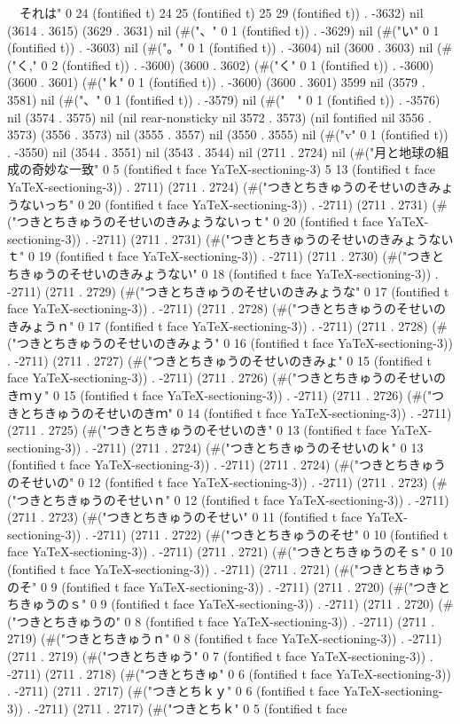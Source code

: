 　それは" 0 24 (fontified t) 24 25 (fontified t) 25 29 (fontified t)) . -3632) nil (3614 . 3615) (3629 . 3631) nil (#("、" 0 1 (fontified t)) . -3629) nil (#("い" 0 1 (fontified t)) . -3603) nil (#("。" 0 1 (fontified t)) . -3604) nil (3600 . 3603) nil (#("く," 0 2 (fontified t)) . -3600) (3600 . 3602) (#("く" 0 1 (fontified t)) . -3600) (3600 . 3601) (#("ｋ" 0 1 (fontified t)) . -3600) (3600 . 3601) 3599 nil (3579 . 3581) nil (#("、" 0 1 (fontified t)) . -3579) nil (#("　" 0 1 (fontified t)) . -3576) nil (3574 . 3575) nil (nil rear-nonsticky nil 3572 . 3573) (nil fontified nil 3556 . 3573) (3556 . 3573) nil (3555 . 3557) nil (3550 . 3555) nil (#("v" 0 1 (fontified t)) . -3550) nil (3544 . 3551) nil (3543 . 3544) nil (2711 . 2724) nil (#("月と地球の組成の奇妙な一致" 0 5 (fontified t face YaTeX-sectioning-3) 5 13 (fontified t face YaTeX-sectioning-3)) . 2711) (2711 . 2724) (#("つきとちきゅうのそせいのきみょうないっち" 0 20 (fontified t face YaTeX-sectioning-3)) . -2711) (2711 . 2731) (#("つきとちきゅうのそせいのきみょうないっｔ" 0 20 (fontified t face YaTeX-sectioning-3)) . -2711) (2711 . 2731) (#("つきとちきゅうのそせいのきみょうないｔ" 0 19 (fontified t face YaTeX-sectioning-3)) . -2711) (2711 . 2730) (#("つきとちきゅうのそせいのきみょうない" 0 18 (fontified t face YaTeX-sectioning-3)) . -2711) (2711 . 2729) (#("つきとちきゅうのそせいのきみょうな" 0 17 (fontified t face YaTeX-sectioning-3)) . -2711) (2711 . 2728) (#("つきとちきゅうのそせいのきみょうｎ" 0 17 (fontified t face YaTeX-sectioning-3)) . -2711) (2711 . 2728) (#("つきとちきゅうのそせいのきみょう" 0 16 (fontified t face YaTeX-sectioning-3)) . -2711) (2711 . 2727) (#("つきとちきゅうのそせいのきみょ" 0 15 (fontified t face YaTeX-sectioning-3)) . -2711) (2711 . 2726) (#("つきとちきゅうのそせいのきｍｙ" 0 15 (fontified t face YaTeX-sectioning-3)) . -2711) (2711 . 2726) (#("つきとちきゅうのそせいのきｍ" 0 14 (fontified t face YaTeX-sectioning-3)) . -2711) (2711 . 2725) (#("つきとちきゅうのそせいのき" 0 13 (fontified t face YaTeX-sectioning-3)) . -2711) (2711 . 2724) (#("つきとちきゅうのそせいのｋ" 0 13 (fontified t face YaTeX-sectioning-3)) . -2711) (2711 . 2724) (#("つきとちきゅうのそせいの" 0 12 (fontified t face YaTeX-sectioning-3)) . -2711) (2711 . 2723) (#("つきとちきゅうのそせいｎ" 0 12 (fontified t face YaTeX-sectioning-3)) . -2711) (2711 . 2723) (#("つきとちきゅうのそせい" 0 11 (fontified t face YaTeX-sectioning-3)) . -2711) (2711 . 2722) (#("つきとちきゅうのそせ" 0 10 (fontified t face YaTeX-sectioning-3)) . -2711) (2711 . 2721) (#("つきとちきゅうのそｓ" 0 10 (fontified t face YaTeX-sectioning-3)) . -2711) (2711 . 2721) (#("つきとちきゅうのそ" 0 9 (fontified t face YaTeX-sectioning-3)) . -2711) (2711 . 2720) (#("つきとちきゅうのｓ" 0 9 (fontified t face YaTeX-sectioning-3)) . -2711) (2711 . 2720) (#("つきとちきゅうの" 0 8 (fontified t face YaTeX-sectioning-3)) . -2711) (2711 . 2719) (#("つきとちきゅうｎ" 0 8 (fontified t face YaTeX-sectioning-3)) . -2711) (2711 . 2719) (#("つきとちきゅう" 0 7 (fontified t face YaTeX-sectioning-3)) . -2711) (2711 . 2718) (#("つきとちきゅ" 0 6 (fontified t face YaTeX-sectioning-3)) . -2711) (2711 . 2717) (#("つきとちｋｙ" 0 6 (fontified t face YaTeX-sectioning-3)) . -2711) (2711 . 2717) (#("つきとちｋ" 0 5 (fontified t face 